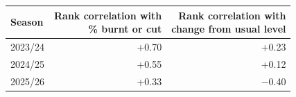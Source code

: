 \begin{tabular}{lrr}
\toprule
Season & \makecell[r]{Rank correlation with\\\% burnt or cut} & \makecell[r]{Rank correlation with\\change from usual level} \\
\midrule
2023/24 & +0.70 & +0.23 \\
2024/25 & +0.55 & +0.12 \\
2025/26 & +0.33 & $-$0.40 \\
\bottomrule
\end{tabular}
